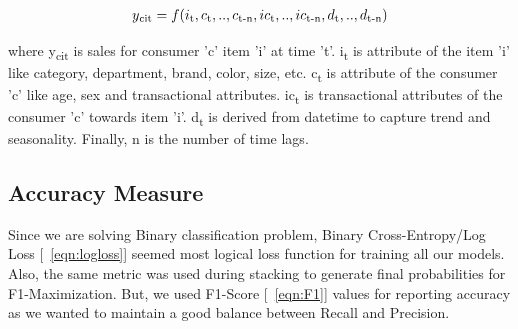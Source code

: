   \begin{equation}
    \begin{array}{l}
      y\textsubscript{cit}  = f(i\textsubscript{t}, c\textsubscript{t},..,c\textsubscript{t-n}, ic\textsubscript{t}
      ,..,ic\textsubscript{t-n}, d\textsubscript{t},..,d\textsubscript{t-n})
    \end{array}
    \label{eqn:fx}
  \end{equation}

where y\textsubscript{cit} is sales for consumer 'c' item ’i’ at time ’t’. 
i\textsubscript{t} is attribute of the item ’i’ like category, department, brand, color, size, etc. 
c\textsubscript{t} is attribute of the consumer 'c' like age, sex and transactional attributes. 
ic\textsubscript{t} is transactional attributes of the consumer 'c'  towards item 'i'. 
d\textsubscript{t} is derived from datetime to capture trend and seasonality. 
Finally, n is the number of time lags.

\subsection{Accuracy Measure}
Since we are solving Binary classification problem, Binary Cross-Entropy/Log Loss [~\ref{eqn:logloss}] seemed most logical loss function 
for training all our models. Also, the same metric was used during stacking to generate final probabilities for 
F1-Maximization. But, we used F1-Score [~\ref{eqn:F1}] values for reporting accuracy as we wanted to maintain a good balance between
Recall and Precision.

